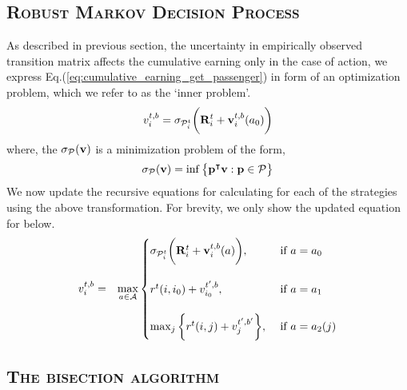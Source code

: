 \iffalse
\subsection{\textsc{Robust Markov Decision Process}}

As described in previous section, the uncertainty in empirically observed transition matrix affects the cumulative earning only in the case of {\getpassenger} action, we express Eq.(\ref{eq:cumulative_earning_get_passenger}) in form of an optimization problem, which we refer to as the `inner problem'.
\begin{equation}
v_{i}^{t,b} = \sigma_{\mathcal{P}_{i}^{t}} \bigg({\mathbf{R}}_{i}^{t} + \mathbf{v}_{i}^{t,b}({a_0})\bigg)
\end{equation}
where, the $\sigma_{\mathcal{P}}(\mathbf{v})$ is a minimization problem of the form,
\begin{equation}
\sigma_{\mathcal{P}}(\mathbf{v}) = \inf\big\{ \mathbf{p}^\intercal\mathbf{v}: \mathbf{p} \in \mathcal{P} \big\}
\end{equation}
We now update the recursive equations for calculating {\totalexpectedearnings} for each of the strategies using the above transformation. For brevity, we only show the updated equation for {\relocationflexible} below.
\begin{eqnarray}
\label{eq:robust_relocationflexible_strategy}
v_{i}^{t,b} &=& \max_{a \in \mathcal{A}}
    \begin{cases}
    \sigma_{\mathcal{P}_{i}^{t}} \bigg({\mathbf{R}}_{i}^{t} + \mathbf{v}_{i}^{t,b}({a})\bigg), &\textrm{  if } a = a_0\\ \\
    r^t(i,{i_0}) + v_{{i_0}}^{t',b}, &\textrm{  if } a = a_1 \\ \\
    \max_{j} \bigg\{r^t(i,j) + v_{j}^{t',b'}\bigg\}, &\textrm{  if } a = a_2(j)
    \end{cases}
\end{eqnarray}

\subsection{\textsc{The bisection algorithm}}

